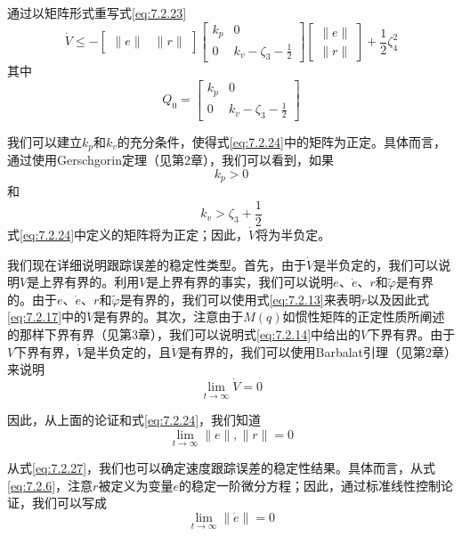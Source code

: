 \documentclass[UTF8]{ctexart}
\begin{document}
通过以矩阵形式重写式\eqref{eq:7.2.23}
\begin{equation}\label{eq:7.2.24}
\dot{V} \leq -\begin{bmatrix} \|e\| & \|r\| \end{bmatrix} \begin{bmatrix} k_p & 0 \\ 0 & k_v - \zeta_3 - \frac{1}{2} \end{bmatrix} \begin{bmatrix} \|e\| \\ \|r\| \end{bmatrix} + \frac{1}{2}\zeta_4^2
\end{equation}
其中
\begin{equation*}
Q_0 = \begin{bmatrix} k_p & 0 \\ 0 & k_v - \zeta_3 - \frac{1}{2} \end{bmatrix}
\end{equation*}

我们可以建立$k_p$和$k_v$的充分条件，使得式\eqref{eq:7.2.24}中的矩阵为正定。具体而言，通过使用Gerschgorin定理（见第2章），我们可以看到，如果
\begin{equation}\label{eq:7.2.25}
k_p > 0
\end{equation}
和
\begin{equation}\label{eq:7.2.26}
k_v > \zeta_3 + \frac{1}{2}
\end{equation}
式\eqref{eq:7.2.24}中定义的矩阵将为正定；因此，$\dot{V}$将为半负定。

我们现在详细说明跟踪误差的稳定性类型。首先，由于$\dot{V}$是半负定的，我们可以说明$V$是上界有界的。利用$V$是上界有界的事实，我们可以说明$e$、$\dot{e}$、$r$和$\tilde{\varphi}$是有界的。由于$e$、$\dot{e}$、$r$和$\tilde{\varphi}$是有界的，我们可以使用式\eqref{eq:7.2.13}来表明$\dot{r}$以及因此式\eqref{eq:7.2.17}中的$\ddot{V}$是有界的。其次，注意由于$M(q)$如惯性矩阵的正定性质所阐述的那样下界有界（见第3章），我们可以说明式\eqref{eq:7.2.14}中给出的$V$下界有界。由于$V$下界有界，$\dot{V}$是半负定的，且$\ddot{V}$是有界的，我们可以使用Barbalat引理（见第2章）来说明
\begin{equation*}
\lim_{t \to \infty} \dot{V} = 0
\end{equation*}

因此，从上面的论证和式\eqref{eq:7.2.24}，我们知道
\begin{equation}\label{eq:7.2.27}
\lim_{t \to \infty} \|e\|, \|r\| = 0
\end{equation}

从式\eqref{eq:7.2.27}，我们也可以确定速度跟踪误差的稳定性结果。具体而言，从式\eqref{eq:7.2.6}，注意$r$被定义为变量$e$的稳定一阶微分方程；因此，通过标准线性控制论证，我们可以写成
\begin{equation}\label{eq:7.2.28}
\lim_{t \to \infty} \|\dot{e}\| = 0
\end{equation}
\end{document}
